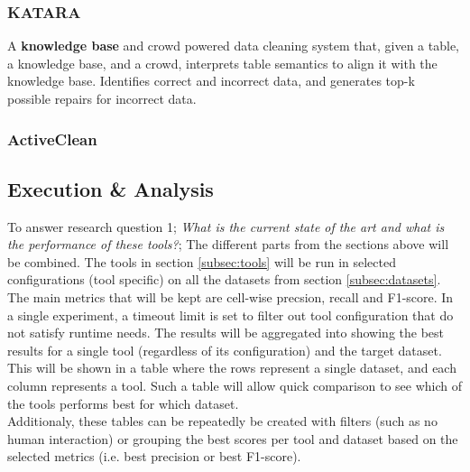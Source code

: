 \subsubsection{KATARA \cite{Chu2015-fs}}
A \textbf{knowledge base} and crowd powered data cleaning system that, given a table, a knowledge base, and a crowd, interprets table semantics to align it with the knowledge base. Identifies correct and incorrect data, and generates top-k possible repairs for incorrect data.

\subsubsection{ActiveClean \cite{Krishnan2016-rg}}


\subsection{Execution \& Analysis}
To answer research question 1; \textit{What is the current state of the art and what is the performance of these tools?}; The different parts from the sections above will be combined. The tools in section \ref{subsec:tools} will be run in selected configurations (tool specific) on all the datasets from section \ref{subsec:datasets}. The main metrics that will be kept are cell-wise precsion, recall and F1-score. In a single experiment, a timeout limit is set to filter out tool configuration that do not satisfy runtime needs. The results will be aggregated into showing the best results for a single tool (regardless of its configuration) and the target dataset. This will be shown in a table where the rows represent a single dataset, and each column represents a tool. Such a table will allow quick comparison to see which of the tools performs best for which dataset.
\\Additionaly, these tables can be repeatedly be created with filters (such as no human interaction) or grouping the best scores per tool and dataset based on the selected metrics (i.e. best precision or best F1-score).